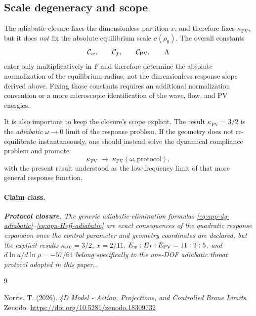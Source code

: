 \documentclass[11pt]{article}
\newcommand{\kPV}{\kappa_{\mathrm{PV}}}
\newcommand{\Protocol}{\textbf{Protocol closure}}
\newcommand{\claimclass}[1]{\paragraph{Claim class.}\emph{#1.}}
\begin{document}
\subsection{Scale degeneracy and scope}
\label{app:adiabatic-scope}

The adiabatic closure fixes the dimensionless partition \(x\), and therefore fixes
\(\kPV\), but it does \emph{not} fix the absolute equilibrium scale \(a(\rho_0)\). The
overall constants
\begin{equation}
\mathcal C_w,\qquad \mathcal C_f,\qquad \mathcal C_{\rm PV},\qquad \Lambda
\label{eq:app-scale-constants}
\end{equation}
enter only multiplicatively in \(F\) and therefore determine the absolute normalization of
the equilibrium radius, not the dimensionless response slope derived above. Fixing those
constants requires an additional normalization convention or a more microscopic
identification of the wave, flow, and PV energies.

It is also important to keep the closure's scope explicit. The result
\(\kPV=3/2\) is the \emph{adiabatic} \(\omega\to 0\) limit of the response problem. If the
geometry does not re-equilibrate instantaneously, one should instead solve the dynamical
compliance problem and promote
\begin{equation}
\kPV
\;\to\;
\kPV(\omega,\text{protocol}),
\label{eq:app-kPV-omega}
\end{equation}
with the present result understood as the low-frequency limit of that more general
response function.

\claimclass{\Protocol. The generic adiabatic-elimination formulas
\eqref{eq:app-dy-adiabatic}--\eqref{eq:app-Heff-adiabatic} are exact consequences of the
quadratic response expansion once the control parameter and geometry coordinates are
declared, but the explicit results
\(\kPV=3/2\), \(x=2/11\), \(E_w:E_f:E_{\rm PV}=11:2:5\), and
\(d\ln a/d\ln\rho=-57/64\) belong specifically to the one-DOF adiabatic throat protocol
adopted in this paper.}

\begin{thebibliography}{9}

Norris, T. (2026).
\textit{4D Model - Action, Projections, and Controlled Brane Limits}.
Zenodo.
\url{https://doi.org/10.5281/zenodo.18309732}

\end{thebibliography}
\end{document}
